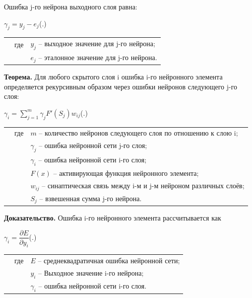 {	\par \redline Ошибка j-го нейрона выходного слоя равна:
	
	\formulaspace \par \redline 
	$\gamma_{j} = y_{j} - e_{j} $\hfill (\thechaptercntr .\theformulacntr) \redline
	\formulaspace \addtocounter{formulacntr}{1}
	
	\begin{tabular}{p{}p{}p{}}
		& где  & $y_{j}$ {--} выходное значение для j-го нейрона; \\
		&      & $e_{j}$ {--} эталонное значение для j-го нейрона. \\
	\end{tabular}
	
	\par \redline \textbf{Теорема.} Для любого скрытого слоя i ошибка i-го нейронного элемента определяется рекурсивным образом через ошибки нейронов следующего j-го слоя:
	
	\formulaspace \par \redline 
	$\gamma_{i} =  \sum \limits _{j=1}^{m} \gamma_{j} F'(S_{j}) w_{ij}$\hfill (\thechaptercntr .\theformulacntr) \redline
	\formulaspace \addtocounter{formulacntr}{1}
	
	\begin{tabular}{p{}p{}p{}}
		& где  & $m$ {--} количество нейронов следующего слоя по отношению к слою i; \\
		&      & $\gamma_{j}$ {--} ошибка нейронной сети j-го слоя; \\
		&      & $\gamma_{i}$ {--} ошибка нейронной сети i-го слоя; \\
		&      & $F(x)$ {--} активирующая функция нейронного элемента; \\
		&      & $w_{ij}$ {--} синаптическая связь между i-м и j-м нейроном различных слоёв; \\
		&      & $S_{j}$ {--} взвешенная сумма j-го нейрона. \\
	\end{tabular}
	
	\par \redline \textbf{Доказательство.}  Ошибка i-го нейронного элемента рассчитывается как
	
	\formulaspace \par \redline 
	$\gamma_{i} =  \dfrac{\partial E}{\partial y_i}$\hfill (\thechaptercntr .\theformulacntr) \redline
	\formulaspace \addtocounter{formulacntr}{1}
	
	\begin{tabular}{p{}p{}p{}}
		& где  & $E$ {--} среднеквадратичная ошибка нейронной сети; \\
		&      & $y_{i}$ {--} Выходное значение i-го нейрона; \\
		&      & $\gamma_{i}$ {--} ошибка нейронной сети i-го слоя. \\
	\end{tabular}
	
}
